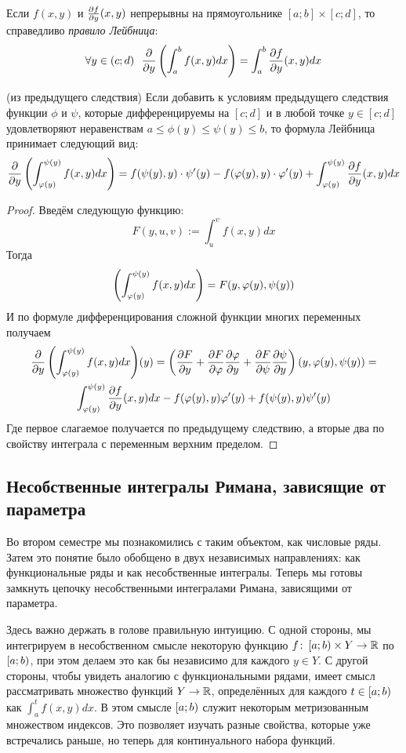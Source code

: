 \begin{corollary}
	Если $f(x, y)$ и $\frac{\partial f}{\partial y}(x, y)$ непрерывны  на прямоугольнике $[a; b] \times [c; d]$, то справедливо \textit{правило Лейбница}:
	\[
		\forall y \in (c; d)\ \ \frac{\partial }{\partial y}\left(\int_a^b f(x, y)dx\right) = \int_a^b \frac{\partial f}{\partial y}(x, y)dx
	\]
\end{corollary}

\begin{corollary} (из предыдущего следствия)
	Если добавить к условиям предыдущего следствия функции $\phi$ и $\psi$, которые дифференцируемы на $[c; d]$ и в любой точке $y \in [c; d]$ удовлетворяют неравенствам $a \le \phi(y) \le \psi(y) \le b$, то формула Лейбница принимает следующий вид:
	\[
		\frac{\partial }{\partial y}\left(\int_{\varphi(y)}^{\psi(y)} f(x, y)dx\right) = f(\psi(y), y) \cdot \psi'(y) - f(\varphi(y), y) \cdot \varphi'(y) + \int_{\varphi(y)}^{\psi(y)} \frac{\partial f}{\partial y}(x, y)dx
	\]
\end{corollary}

\begin{proof}
	Введём следующую функцию:
	\[
		F(y, u, v) := \int_u^v f(x, y) dx
	\]
	Тогда
	\[
		\left(\int_{\varphi(y)}^{\psi(y)} f(x, y)dx\right) = F(y, \varphi(y), \psi(y))
	\]
	И по формуле дифференцирования сложной функции многих переменных получаем
	\begin{multline*}
		\frac{\partial }{\partial y}\left(\int_{\varphi(y)}^{\psi(y)} f(x, y)dx\right)\!(y) = \left(\frac{\partial F}{\partial y} + \frac{\partial F}{\partial \varphi}\frac{\partial \varphi}{\partial y} + \frac{\partial F}{\partial \psi}\frac{\partial \psi}{\partial y}\right)(y, \varphi(y), \psi(y)) = \\
		\int_{\varphi(y)}^{\psi(y)} \frac{\partial f}{\partial y}(x, y)dx -f(\varphi(y), y)\varphi'(y) + f(\psi(y), y)\psi'(y)
	\end{multline*}
	Где первое слагаемое получается по предыдущему следствию, а вторые два по свойству интеграла с переменным верхним пределом.
\end{proof}

\subsection{Несобственные интегралы Римана, зависящие от параметра}

\begin{anote}
	Во втором семестре мы познакомились с таким объектом, как числовые ряды. Затем это понятие было обобщено в двух независимых направлениях: как функциональные ряды и как несобственные интегралы. Теперь мы готовы замкнуть цепочку несобственными интегралами Римана, зависящими от параметра.
	
	Здесь важно держать в голове правильную интуицию. С одной стороны, мы интегрируем в несобственном смысле некоторую функцию $f \colon \left[a; b\right) \times Y \to \mathbb{R}$ по $\left[a; b\right)$, при этом делаем это как бы независимо для каждого $y \in Y$. С другой стороны, чтобы увидеть аналогию с функциональными рядами, имеет смысл рассматривать множество функций $Y \to \mathbb{R}$, определённых для каждого $t \in \left[a; b\right)$ как $\int_a^t f(x, y) dx$. В этом смысле $\left[a; b\right)$ служит некоторым метризованным множеством индексов. Это позволяет изучать разные свойства, которые уже встречались раньше, но теперь для континуального набора функций.
\end{anote} 

